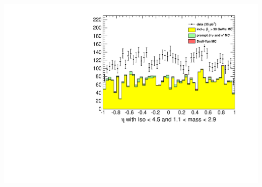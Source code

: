 \documentclass[compress]{beamer}
\begin{document}
\begin{frame}
\begin{columns}
\includegraphics[width=\linewidth]{lowdimuon_eta_midmass_isolated.pdf}
\end{columns}
\end{frame}
\end{document}
